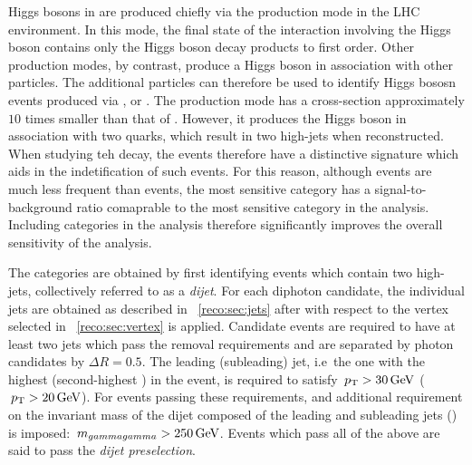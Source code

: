 Higgs bosons in \CMS are produced chiefly via the \ggH production mode in the LHC environment. In this mode, the final state of the interaction involving the Higgs boson contains only the Higgs boson decay products to first order. Other production modes, by contrast, produce a Higgs boson in association with other particles. The additional particles can therefore be used to identify Higgs bososn events produced via \VBF, \VH or \ttH. The \VBF production mode has a cross-section approximately $10$ times smaller than that of \ggH. However, it produces the Higgs boson in association with two quarks, which result in two high-\pT jets when reconstructed. When studying teh \Hgg decay, the \VBF events therefore have a distinctive signature which aids in the indetification of such events. For this reason, although \VBF events are much less frequent than \ggH events, the most sensitive \VBFTag category has a signal-to-background ratio comaprable to the most sensitive category in the analysis. Including \VBFTag categories in the analysis therefore significantly improves the overall sensitivity of the analysis.



The \VBFTag categories are obtained by first identifying events which contain two high-\pT jets, collectively referred to as a \emph{dijet}. For each diphoton candidate, the individual jets are obtained as described in \Sec~\ref{reco:sec:jets} after \PFCHS with respect to the vertex selected in \Sec~\ref{reco:sec:vertex} is applied. Candidate \VBFTag events are required to have at least two jets which pass the \PU removal requirements and are separated by \PF photon candidates by $\Delta R = 0.5$. The leading (subleading) jet, i.e~the one with the highest \pT (second-highest \pT) in the event, is required to satisfy $\,p_\text{T} > 30 \,\text{Ge\hspace{-.08em}V}$ ($\,p_\text{T} > 20 \,\text{Ge\hspace{-.08em}V}$). For events passing these requirements, and additional requirement on the invariant mass of the dijet composed of the leading and subleading jets (\mjj) is imposed: $\,m_{gammagamma} > 250\,\text{Ge\hspace{-.08em}V}$. Events which pass all of the above are said to pass the \emph{dijet preselection}.

